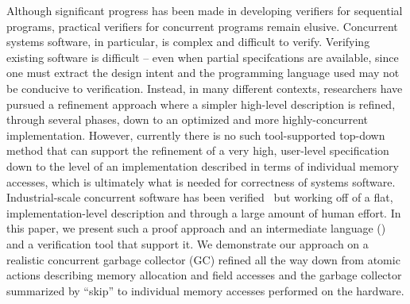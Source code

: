 Although significant progress has been made in developing verifiers for sequential programs, practical verifiers for concurrent programs remain elusive.
Concurrent systems software, in particular, is complex and difficult to verify. 
Verifying existing software is difficult -- even when partial specifcations are available, since one must extract the design intent and the programming language used may not be conducive to verification. 
Instead, in many different contexts, researchers have pursued a refinement approach where a simpler high-level description is refined, through several phases, down to an optimized and more highly-concurrent implementation. 
However, currently there is no such tool-supported top-down method that can support the refinement of a very high, user-level specification down to the level of an implementation described in terms of individual memory accesses, which is ultimately what is needed for correctness of systems software. 
Industrial-scale concurrent software has been verified~\cite{hypervisor} but working off of a flat, implementation-level description and through a large amount of human effort. 
In this paper, we present such a proof approach and an intermediate language (\civl) and a verification tool that support it. 
We demonstrate our approach on a realistic concurrent garbage collector (GC) refined all the way down from atomic actions describing memory allocation and field accesses and the garbage collector summarized by ``skip'' to individual memory accesses performed on the hardware. 

